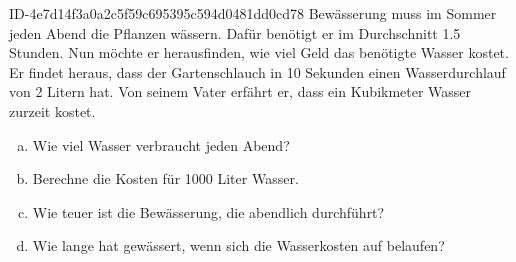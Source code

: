 \begin{exercise}
      {ID-4e7d14f3a0a2c5f59c695395c594d0481dd0cd78}
      {Bewässerung}
  \ifproblem\problem
    \xya{} muss im Sommer jeden Abend die Pflanzen wässern. Dafür benötigt er im
    Durchschnitt \num{1.5} Stunden. Nun möchte er herausfinden, wie viel Geld das
    benötigte Wasser kostet. Er findet heraus, dass der Gartenschlauch in
    10 Sekunden einen Wasserdurchlauf von 2 Litern hat. Von seinem Vater erfährt
    er, dass ein Kubikmeter Wasser zurzeit  kostet.
    \begin{enumerate}[a)]
      \item Wie viel Wasser verbraucht \xya{} jeden Abend?
      \item Berechne die Kosten für 1000 Liter Wasser.
      \item Wie teuer ist die Bewässerung, die \xya{} abendlich durchführt?
      \item Wie lange hat \xya{} gewässert, wenn sich die Wasserkosten auf
             belaufen?
    \end{enumerate}
  \fi
\end{exercise}
